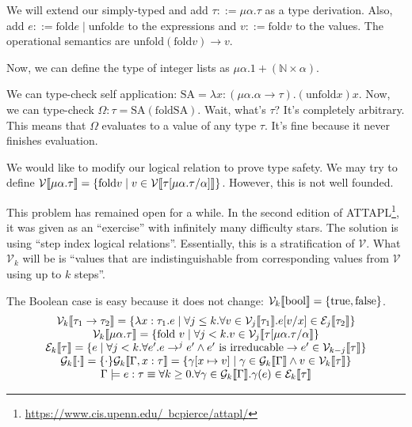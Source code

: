 We will extend our simply-typed \lc and add $\tau ::= \mu \alpha. \tau$ as a type derivation.
Also, add $e ::= \mathrm{fold} e \mid \mathrm{unfold} e$ to the expressions and $v ::= \mathrm{fold} v$
to the values. The operational semantics are $\mathrm{unfold} (\mathrm{fold} v) \to v$.

Now, we can define the type of integer lists as $\mu \alpha. 1 + (\mathbb{N} \times \alpha)$.

We can type-check self application: $\mathrm{SA} = \lambda x: (\mu \alpha. \alpha \to \tau). (\mathrm{unfold} x) x$.
Now, we can type-check $\Omega: \tau = \mathrm{SA} (\mathrm{fold SA})$. Wait, what's $\tau$? It's completely
arbitrary. This means that $\Omega$ evaluates to a value of any type $\tau$. It's fine because it never finishes
evaluation.

We would like to modify our logical relation to prove type safety. 
We may try to define 
$\mathcal{V} \llbracket \mu \alpha. \tau \rrbracket = \{ \mathrm{fold} v \mid v \in \mathcal{V}\llbracket \tau[\mu \alpha. \tau / \alpha] \rrbracket\}$.
However, this is not well founded. 

This problem has remained open for a while. 
In the second edition of ATTAPL\footnote{\href{https://www.cis.upenn.edu/~bcpierce/attapl/}{https://www.cis.upenn.edu/~bcpierce/attapl/}}, 
it was given as an ``exercise'' with infinitely many difficulty stars. The solution
is using ``step index logical relations''. Essentially, this is a stratification of $\mathcal{V}$.
What $\mathcal{V}_k$ will be is ``values that are indistinguishable from corresponding values from $\mathcal{V}$ using up to
$k$ steps''.

The Boolean case is easy because it does not change: $\mathcal{V}_k\llbracket \mathrm{bool} \rrbracket = \{\mathrm{true}, \mathrm{false}\}$.
\[
\begin{array}{c}
\mathcal{V}_k\llbracket \tau_1 \to \tau_2 \rrbracket = \{\lambda x: \tau_1. e \mid \forall j \leq k. \forall v\in \mathcal{V}_j\llbracket\tau_1 \rrbracket.
e[v/x] \in \mathcal{E}_j \llbracket \tau_2 \rrbracket\} \\
\mathcal{V}_k\llbracket\mu \alpha. \tau \rrbracket = \{\mathrm{fold~} v \mid \forall j < k. v \in 
\mathcal{V}_j\llbracket \tau[\mu \alpha. \tau / \alpha \rrbracket\} \\
\mathcal{E}_k \llbracket \tau \rrbracket = \{e \mid \forall j < k. \forall e'. e \to^j e' \wedge e' 
\mathrm{~is~irreducable} \to e' \in \mathcal{V}_{k - j}\llbracket \tau \rrbracket\} \\
\mathcal{G}_k \llbracket \cdot \rrbracket = \{\cdot \}
\mathcal{G}_k \llbracket \Gamma, x: \tau \rrbracket = \{\gamma[x\mapsto v] \mid \gamma \in \mathcal{G}_k \llbracket \Gamma \rrbracket 
\wedge v\in \mathcal{V}_k\llbracket \tau \rrbracket\} \\
\Gamma \models e : \tau \equiv \forall k \geq 0. \forall \gamma \in \mathcal{G}_k \llbracket \Gamma 
\rrbracket. \gamma(e) \in \mathcal{E}_k \llbracket \tau \rrbracket
\end{array}
\]

